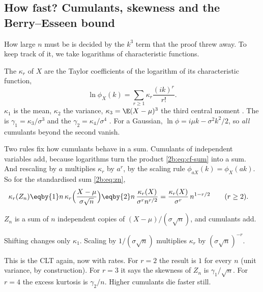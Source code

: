 \subsection{How fast? Cumulants, skewness and the Berry--Esseen bound}
\label{2b:sec:clt-rate}

How large $n$ must be is decided by the $k^3$ term that the proof threw away. To keep track of it, we take logarithms of characteristic functions.

\begin{workdef}[cumulants]
The  $\kappa_r$ of $X$ are the Taylor coefficients of the logarithm of its characteristic function,
\begin{equation}
  \ln\phi_X(k)=\sum_{r\ge1}\kappa_r\frac{(ik)^r}{r!} .
  \label{2b:eq:cumulants}
\end{equation}
$\kappa_1$ is the mean, $\kappa_2$ the variance, $\kappa_3=\E(X-\mu)^3$ the third central moment . The  is $\gamma_1=\kappa_3/\sigma^3$ and the  $\gamma_2=\kappa_4/\sigma^4$ . For a Gaussian, $\ln\phi=i\mu k-\sigma^2k^2/2$, so \emph{all} cumulants beyond the second vanish.
\end{workdef}

Two rules fix how cumulants behave in a sum. Cumulants of independent variables add, because logarithms turn the product \eqref{2b:eq:cf-sum} into a sum. And rescaling by $a$ multiplies $\kappa_r$ by $a^r$, by the scaling rule $\phi_{aX}(k)=\phi_X(ak)$. So for the standardised sum \eqref{2b:eq:zn},
\begin{align}
  \kappa_r(Z_n)
  &\eqby{1} n\,\kappa_r\Bigl(\frac{X-\mu}{\sigma\sqrt n}\Bigr)
  \eqby{2} n\,\frac{\kappa_r(X)}{\sigma^r n^{r/2}}
  = \frac{\kappa_r(X)}{\sigma^r}\,n^{1-r/2}\qquad(r\ge2) .
  \label{2b:eq:cumulant-scaling}
\end{align}
\begin{explain}
  \item $Z_n$ is a sum of $n$ independent copies of $(X-\mu)/(\sigma\sqrt n)$, and cumulants add.
  \item Shifting changes only $\kappa_1$. Scaling by $1/(\sigma\sqrt n)$ multiplies $\kappa_r$ by $(\sigma\sqrt n)^{-r}$.
\end{explain}
This is the CLT again, now with rates. For $r=2$ the result is $1$ for every $n$ (unit variance, by construction). For $r=3$ it says the skewness of $Z_n$ is $\gamma_1/\sqrt n$. For $r=4$ the excess kurtosis is $\gamma_2/n$. Higher cumulants die faster still.

